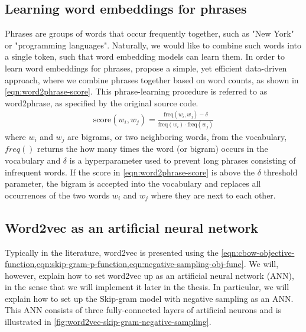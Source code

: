 \subsection{Learning word embeddings for phrases}
\label{sec:learning-word-embeddings-for-phrases}
Phrases are groups of words that occur frequently together, such as "New York" or "programming languages". Naturally, we would like to combine such words into a single token, such that word embedding models can learn them. In order to learn word embeddings for phrases, \cite[4 Learning Phrases]{mikolov2013b} propose a simple, yet efficient data-driven approach, where we combine phrases together based on word counts, as shown in \cref{eqn:word2phrase-score}. This phrase-learning procedure is referred to as word2phrase, as specified by the original source code.
\begin{align}
    \text{score}(w_i, w_j) = \frac{\text{freq}(w_i, w_j) - \delta}{\text{freq}(w_i) \cdot \text{freq}(w_j)}
    \label{eqn:word2phrase-score}
\end{align}
where $w_i$ and $w_j$ are bigrams, or two neighboring words, from the vocabulary, $freq()$ returns the how many times the word (or bigram) occurs in the vocabulary and $\delta$ is a hyperparameter used to prevent long phrases consisting of infrequent words. If the score in \cref{eqn:word2phrase-score} is above the $\delta$ threshold parameter, the bigram is accepted into the vocabulary and replaces all occurrences of the two words $w_i$ and $w_j$ where they are next to each other.

\subsection{Word2vec as an artificial neural network}
\label{sec:word2vec-as-an-ann}
Typically in the literature, word2vec is presented using the \cref{eqn:cbow-objective-function,eqn:skip-gram-p-function,eqn:negative-sampling-obj-func}. We will, however, explain how to set word2vec up as an artificial neural network (ANN), in the sense that we will implement it later in the thesis. In particular, we will explain how to set up the Skip-gram model with negative sampling as an ANN. This ANN consists of three fully-connected layers of artificial neurons \cite{rong2016word2vec} and is illustrated in \cref{fig:word2vec-skip-gram-negative-sampling}.

